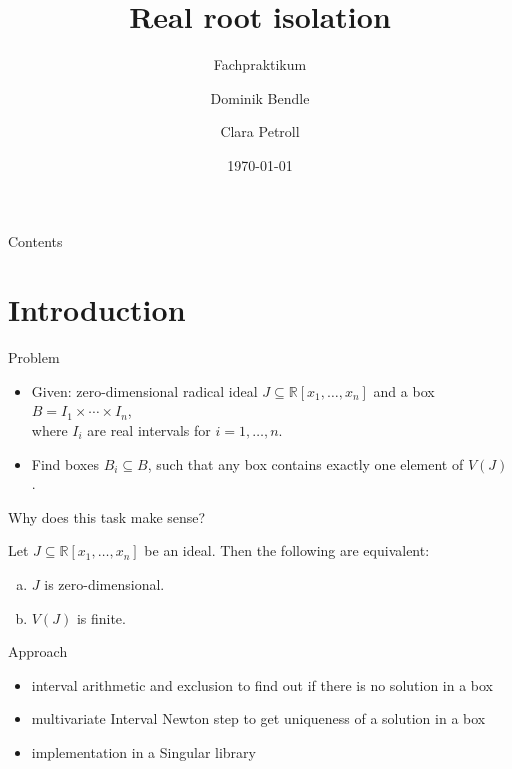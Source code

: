 \documentclass[german,10pt,xcolor=colortbl,compress, handout]{beamer}
\title{Real root isolation}
\subtitle{Fachpraktikum}
\date{\today}
\author{Dominik Bendle \and Clara Petroll}
\institute{AG Algebra, Geometrie und Computeralgebra \\ Supervisor: Janko Böhm}
\begin{document}
\maketitle
\begin{frame}{Contents}
    \tableofcontents
\end{frame}

\section{Introduction}
\begin{frame}{Problem}
    \begin{itemize}
        \item Given: zero-dimensional radical ideal  $J \subseteq \mathbb{R}[x_1, \hdots,
            x_n]$ and a box  $B=I_1 \times \cdots \times I_n$, \\where $I_i$ are real intervals for $i=1,\hdots,n$.
        \item Find boxes $B_i \subseteq B$, such that any box contains exactly one element
            of $V(J)$.
    \end{itemize}
    \pause

    Why does this task make sense?
    \begin{lemma}
        Let $J \subseteq \mathbb{R}[x_1, \hdots, x_n]$ be an ideal. Then the following are
        equivalent:
        \begin{enumerate}[a)]
            \item $J$ is zero-dimensional.
            \item $V(J)$ is finite.
        \end{enumerate}
    \end{lemma}
\end{frame}

\begin{frame}{Approach}
    \begin{itemize}
    \item interval arithmetic and exclusion to find out if there is no solution in a box
    \item multivariate Interval Newton step to get uniqueness of a solution in a box
    \item implementation in a Singular library
    \end{itemize}
\end{frame}
\end{document}
